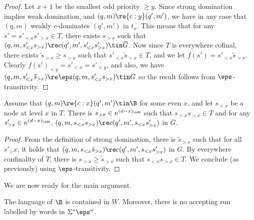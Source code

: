 \begin{proof}
Let $x+1$ be the smallest odd priority $\geq y$.
Since strong domination implies weak domination, and $(q,m) \re{c:y} (q',m')$, we have in any case that $(q,m)$ weakly $c$-dominates $(q',m')$ in $t_{x}$.
This means that for any $s'=s'_{< x}s'_{> x} \in T$, there exists $s_{> x}$ such that $(q,m,s'_{< x}s_{> x}) \re c (q',m',s'_{< x}s'_{> x}) \tin \overline G$.
Now since $T$ is everywhere cofinal, there exists $\tilde s_{> x} \geq s_{> x}$ such that $s'_{<x}\tilde s_{> x} \in T$, and we let $f(s')=s'_{<x}\tilde s_{> x}$.
Clearly $f(s')_{< y} = s'_{< x} = s'_{< y}$, and also, we have $(q,m,s'_{<x}\tilde s_{> x} ) \re \eps (q,m,s'_{<x}s_{> x})\tin G$ so the result follows from $\eps$-transitivity.
\end{proof}

\begin{lemma}\label{lem:technical2}
    Assume that $(q,m) \re{c:x} (q',m') \tin \B$ for some even $x$, and let $s_{< x}$ be a node at level $x$ in $T$.
    There is $s_{> x} \in \kappa^{(d-x)_\odd}$ such that $s_{< x}s_{> x} \in T$ and for any $s'_{> x} \in \kappa^{(d-x)_\odd}$, $(q,m,s_{< x}s_{> x}) \re c (q',m',s_{<x}s'_{> x})$ in $\overline G$.
\end{lemma}

\begin{proof}
    From the definition of strong domination, there is $\tilde s_{>x}$ such that for all $s'_>x$, it holds that $(q,m,s_{<x} \tilde s_{>x}) \re c (q',m',s_{<x} s'_{>x})$ in $\overline G$. By everywhere confinality of $T$, there is $s_{>x} 
    \geq \tilde s_{>x}$ such that $s_{<x} s_{>x} \in T$.
    We conclude (as previously) using $\eps$-transitivity.
\end{proof}

We are now ready for the main argument.

\begin{lemma}\label{lem:language-containement}
    The language of $\B$ is contained in $W$.
    Moreover, there is no accepting run labelled by words in $\Sigma^* \eps^\omega$.
\end{lemma}

